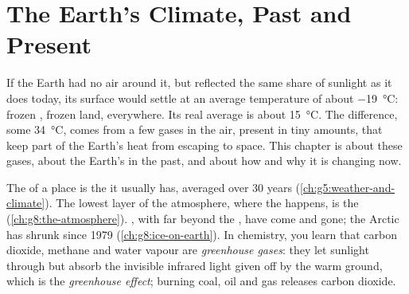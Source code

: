 \chapter{The Earth's Climate, Past and Present}\label{ch:g9:climate-past-and-present}

If the Earth had no air around it, but reflected the same share of
sunlight as it does today, its surface would settle at an average
temperature of about \qty{-19}{\degreeCelsius}: frozen , frozen land,
everywhere. Its real average is about \qty{15}{\degreeCelsius}. The
difference, some \qty{34}{\degreeCelsius}, comes from a few gases in the
air, present in tiny amounts, that keep part of the Earth's heat from
escaping to space. This chapter is about these gases, about the Earth's
 in the past, and about how and why it is changing now.

\begin{recall}
The  of a place is the  it usually has, averaged over 30
years (\cref{ch:g5:weather-and-climate}). The lowest layer of the
atmosphere, where the  happens, is the 
(\cref{ch:g8:the-atmosphere}). , with  far beyond the
, have come and gone; the Arctic  has shrunk since 1979
(\cref{ch:g8:ice-on-earth}). In chemistry, you learn that carbon
dioxide, methane and water vapour are \emph{greenhouse gases}: they let
sunlight through but absorb the invisible infrared light given off by
the warm ground, which is the \emph{greenhouse effect}; burning coal, oil
and gas releases carbon dioxide.
\end{recall}

